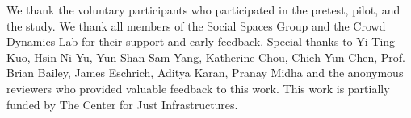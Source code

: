 \begin{acks}
    We thank the voluntary participants who participated in the pretest, pilot, and the study. We thank all members of the Social Spaces Group and the Crowd Dynamics Lab for their support and early feedback. Special thanks to Yi-Ting Kuo, Hsin-Ni Yu, Yun-Shan Sam Yang, Katherine Chou, Chieh-Yun Chen, Prof. Brian Bailey, James Eschrich, Aditya Karan, Pranay Midha and the anonymous reviewers who provided valuable feedback to this work. This work is partially funded by The Center for Just Infrastructures.
\end{acks}
